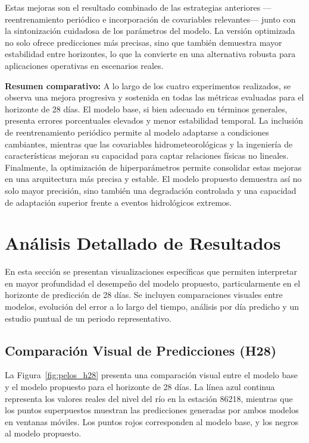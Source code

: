 Estas mejoras son el resultado combinado de las estrategias anteriores —reentrenamiento periódico e incorporación de covariables relevantes— junto con la sintonización cuidadosa de los parámetros del modelo. La versión optimizada no solo ofrece predicciones más precisas, sino que también demuestra mayor estabilidad entre horizontes, lo que la convierte en una alternativa robusta para aplicaciones operativas en escenarios reales.

\vspace{1em}
\noindent
\textbf{Resumen comparativo:} A lo largo de los cuatro experimentos realizados, se observa una mejora progresiva y sostenida en todas las métricas evaluadas para el horizonte de 28 días. El modelo base, si bien adecuado en términos generales, presenta errores porcentuales elevados y menor estabilidad temporal. La inclusión de reentrenamiento periódico permite al modelo adaptarse a condiciones cambiantes, mientras que las covariables hidrometeorológicas y la ingeniería de características mejoran su capacidad para captar relaciones físicas no lineales. Finalmente, la optimización de hiperparámetros permite consolidar estas mejoras en una arquitectura más precisa y estable. El modelo propuesto demuestra así no solo mayor precisión, sino también una degradación controlada y una capacidad de adaptación superior frente a eventos hidrológicos extremos.



\section{Análisis Detallado de Resultados}
\label{sec:analisis_resultados}

En esta sección se presentan visualizaciones específicas que permiten interpretar en mayor profundidad el desempeño del modelo propuesto, particularmente en el horizonte de predicción de 28 días. Se incluyen comparaciones visuales entre modelos, evolución del error a lo largo del tiempo, análisis por día predicho y un estudio puntual de un periodo representativo.

\subsection{Comparación Visual de Predicciones (H28)}
\label{ssec:comparacion_visual_pelos}

La Figura~\ref{fig:pelos_h28} presenta una comparación visual entre el modelo base y el modelo propuesto para el horizonte de 28 días. La línea azul continua representa los valores reales del nivel del río en la estación 86218, mientras que los puntos superpuestos muestran las predicciones generadas por ambos modelos en ventanas móviles. Los puntos rojos corresponden al modelo base, y los negros al modelo propuesto.

